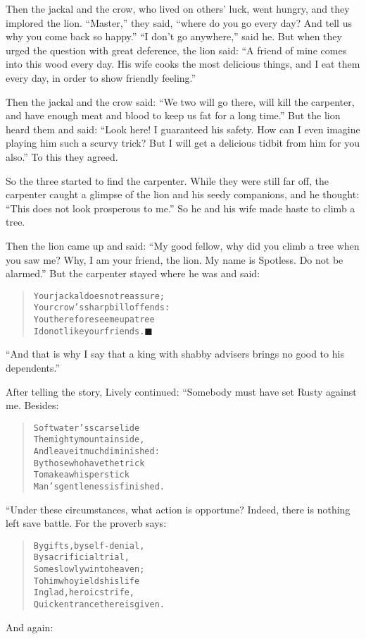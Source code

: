 \documentclass[article, twoside, 14pt]{memoir}
\newcommand{\qed}{\hfill \ensuremath{\blacksquare}}
\renewenvironment{verbatim}{%
\begin{quote}%
\vskip -10pt%
\begin{alltt}\normalfont\large}{\end{alltt}%
\end{quote}%
\vskip -10pt
} %
\begin{document}
Then the jackal and the crow, who lived on others' luck, went
hungry, and they implored the lion. ``Master,'' they said,
``where do you go every day? And tell us why you come back so happy.''
``I don't go anywhere,'' said he. But when they urged the
question with great deference, the lion said:
``A friend of mine comes into this wood every day. His wife cooks the most delicious things, and I eat them every day, in order to show friendly feeling.''

Then the jackal and the crow said:
``We two will go there, will kill the carpenter, and have enough meat and blood to keep us fat for a long time.''
But the lion heard them and said:
``Look here! I guaranteed his safety. How can I even imagine playing him such a scurvy trick? But I will get a delicious tidbit from him for you also.''
To this they agreed.

So the three started to find the carpenter. While they were still
far off, the carpenter caught a glimpse of the lion and his seedy
companions, and he thought:
``This does not look prosperous to me.'' So he and his wife made
haste to climb a tree.

Then the lion came up and said:
``My good fellow, why did you climb a tree when you saw me? Why, I am your friend, the lion. My name is Spotless. Do not be alarmed.''
But the carpenter stayed where he was and said:

\begin{verbatim}
Your jackal does not reassure;
    Your crow's sharp bill offends:
You therefore see me up a tree{\textemdash}
    I do not like your friends.\hyperref[s17]{\qed}
\end{verbatim}
``And that is why I say that a king with shabby advisers brings no good to his dependents.''

After telling the story, Lively continued: “Somebody must have set
Rusty against me. Besides:

\begin{verbatim}
Soft water's scars elide
The mighty mountain side,
    And leave it much diminished:
By those who have the trick
To make a whisper stick
    Man's gentleness is finished.
\end{verbatim}
“Under these circumstances, what action is opportune? Indeed, there
is nothing left save battle. For the proverb says:

\begin{verbatim}
By gifts, by self-denial,
By sacrificial trial,
    Some slowly win to heaven;
To him who yields his life
In glad, heroic strife,
    Quick entrance there is given.
\end{verbatim}
And again:
\end{document}

